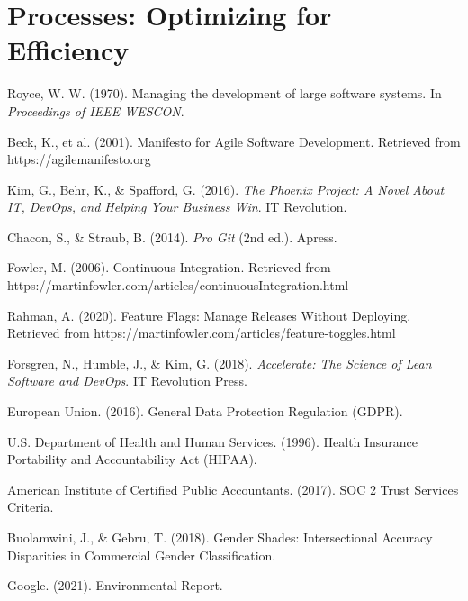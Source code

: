 \chapter{Processes: Optimizing for Efficiency}







\begin{thebibliography}{9}

     Royce, W. W. (1970). Managing the development of large software systems. In \textit{Proceedings of IEEE WESCON}.

     Beck, K., et al. (2001). Manifesto for Agile Software Development. Retrieved from https://agilemanifesto.org

     Kim, G., Behr, K., \& Spafford, G. (2016). \textit{The Phoenix Project: A Novel About IT, DevOps, and Helping Your Business Win}. IT Revolution.

     Chacon, S., \& Straub, B. (2014). \textit{Pro Git} (2nd ed.). Apress.

     Fowler, M. (2006). Continuous Integration. Retrieved from https://martinfowler.com/articles/continuousIntegration.html

     Rahman, A. (2020). Feature Flags: Manage Releases Without Deploying. Retrieved from https://martinfowler.com/articles/feature-toggles.html

     Forsgren, N., Humble, J., \& Kim, G. (2018). \textit{Accelerate: The Science of Lean Software and DevOps}. IT Revolution Press.

    European Union. (2016). General Data Protection Regulation (GDPR).

    U.S. Department of Health and Human Services. (1996). Health Insurance Portability and Accountability Act (HIPAA).

    American Institute of Certified Public Accountants. (2017). SOC 2 Trust Services Criteria.

    Buolamwini, J., \& Gebru, T. (2018). Gender Shades: Intersectional Accuracy Disparities in Commercial Gender Classification.

    Google. (2021). Environmental Report.

\end{thebibliography}

